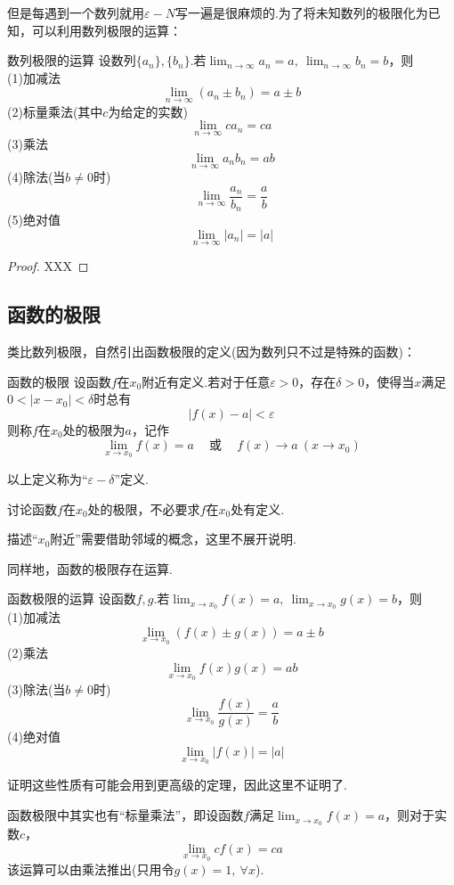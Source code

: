 \documentclass[lang=cn, zihao=5]{elegantbook}
\newcommand{\cor}{~\textit{或}~}
\begin{document}
但是每遇到一个数列就用$\varepsilon - N$写一遍是很麻烦的.为了将未知数列的极限化为已知，可以利用数列极限的运算：

\begin{theorem}{数列极限的运算} %
	设数列$\{ a_n \},\{ b_n \}$.若$\lim_{n \to \infty} a_n=a,~\lim_{n \to \infty} b_n=b$，则 \\
	(1)加减法$$\lim_{n \to \infty}{(a_n \pm b_n)} = a \pm b$$
	(2)标量乘法(其中$c$为给定的实数)$$\lim_{n \to \infty}{ca_n}=ca$$
	(3)乘法$$\lim_{n \to \infty}{a_nb_n} = ab$$
	(4)除法(当$b \neq 0$时)$$\lim_{n \to \infty}{\frac{a_n}{b_n}} = \frac{a}{b}$$
	(5)绝对值$$\lim_{n \to \infty}{|a_n|} = |a|$$
\end{theorem}
\begin{proof}
	XXX
\end{proof}

\subsection{函数的极限}

类比数列极限，自然引出函数极限的定义(因为数列只不过是特殊的函数)：

\begin{definition}{函数的极限}
	设函数$f$在$x_0$附近有定义.若对于任意$\varepsilon > 0$，存在$\delta > 0$，使得当$x$满足$0<|x-x_0|<\delta$时总有$$|f(x)-a|<\varepsilon$$
	则称$f$在$x_0$处的极限为$a$，记作$$\lim_{x \to x_0}{f(x)=a} \quad \cor \quad f(x) \to a~(x \to x_0)$$
\end{definition}
\begin{remark}
	以上定义称为“$\varepsilon - \delta$”定义.
\end{remark}
\begin{remark}
	讨论函数$f$在$x_0$处的极限，不必要求$f$在$x_0$处有定义.
\end{remark}
\begin{remark}
	描述“$x_0$附近”需要借助邻域的概念，这里不展开说明.
\end{remark}

同样地，函数的极限存在运算.

\begin{theorem}{函数极限的运算} %
	设函数$f,g$.若$\lim_{x \to x_0} f(x)=a,~\lim_{x \to x_0} g(x)=b$，则 \\
	(1)加减法$$\lim_{x \to x_0}{(f(x) \pm g(x))} = a \pm b$$
	(2)乘法$$\lim_{x \to x_0}{f(x)g(x)} = ab$$
	(3)除法(当$b \neq 0$时)$$\lim_{x \to x_0}{\frac{f(x)}{g(x)}} = \frac{a}{b}$$
	(4)绝对值$$\lim_{x \to x_0}{|f(x)|} = |a|$$
\end{theorem}
\begin{remark}
	证明这些性质有可能会用到更高级的定理，因此这里不证明了.
\end{remark}
\begin{remark}
	函数极限中其实也有“标量乘法”，即设函数$f$满足$\lim_{x \to x_0}f(x)=a$，则对于实数$c$，$$\lim_{x \to x_0}{cf(x)}=ca$$
	该运算可以由乘法推出(只用令$g(x)=1,~\forall x$).
\end{remark}
\end{document}
